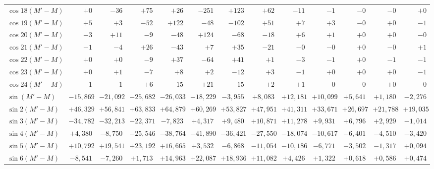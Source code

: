 \begin{landscape}
\begin{longtable}{@{}l|r|r|r|r|r|r|r|r|r|r|r|r@{}}
\(\cos 18(M'-M)\) & \(+0\) & \(-36\) & \(+75\) & \(+26\) & \(-251\) & \(+123\) & \(+62\) & \(-11\) & \(-1\) & \(-0\) & \(-0\) & \(+0\)\\
\(\cos 19(M'-M)\) & \(+5\) & \(+3\) & \(-52\) & \(+122\) & \(-48\) & \(-102\) & \(+51\) & \(+7\) & \(+3\) & \(-0\) & \(+0\) & \(-1\)\\
\(\cos 20(M'-M)\) & \(-3\) & \(+11\) & \(-9\) & \(-48\) & \(+124\) & \(-68\) & \(-18\) & \(+6\) & \(+1\) & \(+0\) & \(+0\) & \(-0\)\\
\(\cos 21(M'-M)\) & \(-1\) & \(-4\) & \(+26\) & \(-43\) & \(+7\) & \(+35\) & \(-21\) & \(-0\) & \(-0\) & \(+0\) & \(-0\) & \(+1\)\\
\(\cos 22(M'-M)\) & \(+0\) & \(+0\) & \(-9\) & \(+37\) & \(-64\) & \(+41\) & \(+1\) & \(-3\) & \(-1\) & \(+0\) & \(-1\) & \(-1\)\\
\(\cos 23(M'-M)\) & \(+0\) & \(+1\) & \(-7\) & \(+8\) & \(+2\) & \(-12\) & \(+3\) & \(-1\) & \(+0\) & \(+0\) & \(+0\) & \(-1\)\\
\(\cos 24(M'-M)\) & \(-1\) & \(-1\) & \(+6\) & \(-15\) & \(+21\) & \(-15\) & \(+2\) & \(+1\) & \(-0\) & \(-0\) & \(+0\) & \(-0\)\\[6pt]
\(\sin(M'-M)\) & \(-15{,}869\) & \(-21{,}092\) & \(-25{,}682\) & \(-26{,}033\) & \(-18{,}229\) & \(-3{,}955\) & \(+8{,}083\) & \(+12{,}181\) & \(+10{,}099\) & \(+5{,}641\) & \(+1{,}180\) & \(-2{,}276\)\\
\(\sin 2(M'-M)\) & \(+46{,}329\) & \(+56{,}841\) & \(+63{,}833\) & \(+64{,}879\) & \(+60{,}269\) & \(+53{,}827\) & \(+47{,}951\) & \(+41{,}311\) & \(+33{,}671\) & \(+26{,}697\) & \(+21{,}788\) & \(+19{,}035\)\\
\(\sin 3(M'-M)\) & \(-34{,}782\) & \(-32{,}213\) & \(-22{,}371\) & \(-7{,}823\) & \(+4{,}317\) & \(+9{,}480\) & \(+10{,}871\) & \(+11{,}278\) & \(+9{,}931\) & \(+6{,}796\) & \(+2{,}929\) & \(-1{,}014\)\\
\(\sin 4(M'-M)\) & \(+4{,}380\) & \(-8{,}750\) & \(-25{,}546\) & \(-38{,}764\) & \(-41{,}890\) & \(-36{,}421\) & \(-27{,}550\) & \(-18{,}074\) & \(-10{,}617\) & \(-6{,}401\) & \(-4{,}510\) & \(-3{,}420\)\\
\(\sin 5(M'-M)\) & \(+10{,}792\) & \(+19{,}541\) & \(+23{,}192\) & \(+16{,}665\) & \(+3{,}532\) & \(-6{,}868\) & \(-11{,}054\) & \(-10{,}186\) & \(-6{,}771\) & \(-3{,}502\) & \(-1{,}317\) & \(+0{,}094\)\\
\(\sin 6(M'-M)\) & \(-8{,}541\) & \(-7{,}260\) & \(+1{,}713\) & \(+14{,}963\) & \(+22{,}087\) & \(+18{,}936\) & \(+11{,}082\) & \(+4{,}426\) & \(+1{,}322\) & \(+0{,}618\) & \(+0{,}586\) & \(+0{,}474\)\\

\end{longtable}
\end{landscape}
